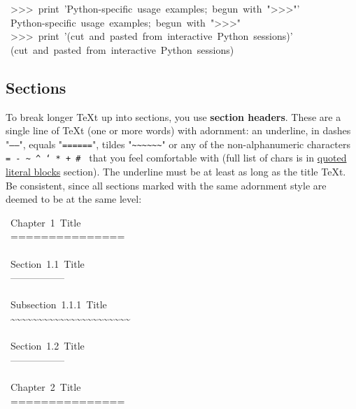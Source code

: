\documentclass[12pt]{article}
\begin{document}
\begin{ttfamily}\begin{flushleft}
\mbox{~>>>~print~'Python-specific~usage~examples;~begun~with~">>>"'}\\
\mbox{~Python-specific~usage~examples;~begun~with~">>>"}\\
\mbox{~>>>~print~'(cut~and~pasted~from~interactive~Python~sessions)'}\\
\mbox{~(cut~and~pasted~from~interactive~Python~sessions)}\\
\end{flushleft}\end{ttfamily}

\hypertarget{lsections}{}
\subsection{Sections}

To break longer \TeX{}t up into sections, you use \textbf{section headers}. These are
a single line of \TeX{}t (one or more words) with adornment: an underline, in
dashes "\texttt{-----}", equals "\texttt{======}", tildes "\texttt{\~{}\~{}\~{}\~{}\~{}\~{}}" or any of the
non-alphanumeric characters \texttt{= - \~{} \^{} ` * + \# } that you feel comfortable
with (full list of chars is in \href{\#lquoted-literal-blocks}{quoted literal blocks} section). The
underline must be at least as long as the title \TeX{}t. Be consistent, since
all sections marked with the same adornment style are deemed to be at the same
level:

\begin{ttfamily}\begin{flushleft}
\mbox{~Chapter~1~Title}\\
\mbox{~===============}\\
\mbox{}\\
\mbox{~Section~1.1~Title}\\
\mbox{~-----------------}\\
\mbox{}\\
\mbox{~Subsection~1.1.1~Title}\\
\mbox{~\~{}\~{}\~{}\~{}\~{}\~{}\~{}\~{}\~{}\~{}\~{}\~{}\~{}\~{}\~{}\~{}\~{}\~{}\~{}\~{}\~{}\~{}}\\
\mbox{}\\
\mbox{~Section~1.2~Title}\\
\mbox{~-----------------}\\
\mbox{}\\
\mbox{~Chapter~2~Title}\\
\mbox{~===============}\\
\end{flushleft}\end{ttfamily}
\end{document}
